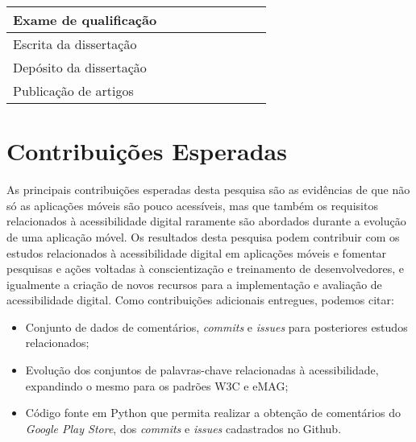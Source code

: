 \begin{table}[h]
\begin{tabular}{|l|c|c|c|c|c|c|c|c|}
  Exame de qualificação
  & \x & \x & \x & \x & \x  & \y & \x & \x \\
  \hline  
  
  Escrita da dissertação
  & \x & \x & \x & \x & \x  & \x & \y & \y \\
  \hline  
  
  Depósito da dissertação
  & \x & \x & \x & \x & \x  & \x & \x & \y \\
  \hline  
  
  Publicação de artigos
  & \x & \x & \y & \x & \x  & \x & \x & \y \\
  \hline  
  
 
\end{tabular}
 \normalsize
\end{table}




\section{Contribuições Esperadas}
As principais contribuições esperadas desta pesquisa são as evidências de que não só as aplicações móveis são pouco acessíveis, mas que também os requisitos relacionados à acessibilidade digital raramente são abordados durante a evolução de uma aplicação móvel.
Os resultados desta pesquisa podem contribuir com os estudos relacionados à acessibilidade digital em aplicações móveis e fomentar pesquisas e ações voltadas à conscientização e treinamento de desenvolvedores, e igualmente a criação de novos recursos para
a implementação e avaliação de acessibilidade digital.
Como contribuições adicionais entregues, podemos citar:

\begin{itemize}
	\item Conjunto de dados de comentários, \textit{commits} e \textit{issues} para posteriores estudos relacionados;
	\item Evolução dos conjuntos de palavras-chave relacionadas à acessibilidade, expandindo o mesmo para os padrões W3C e eMAG;
	\item Código fonte em Python que permita realizar a obtenção de comentários do \textit{Google Play Store}, dos \textit{commits} e \textit{issues} cadastrados no Github.
\end{itemize}



